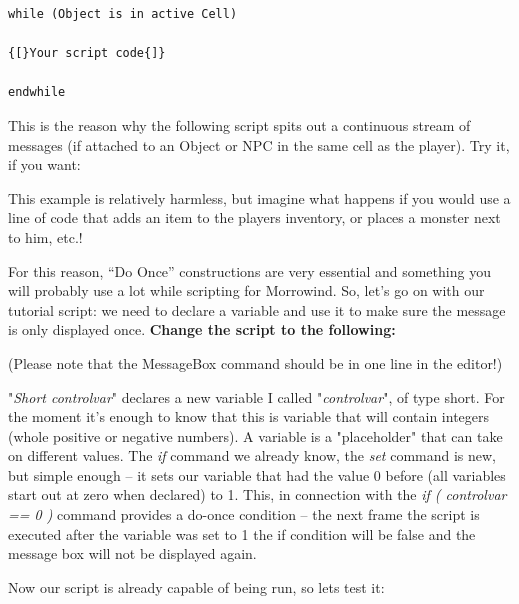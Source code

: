 \begin{lstlisting}
while (Object is in active Cell)

{[}Your script code{]}

endwhile
\end{lstlisting}

This is the reason why the following script spits out a continuous stream of messages (if attached to an Object or NPC in the same cell as the player). Try it, if you want:



This example is relatively harmless, but imagine what happens if you would use a line of code that adds an item to the players inventory, or places a monster next to him, etc.!

For this reason, ``Do Once'' constructions are very essential and something you will probably use a lot while scripting for Morrowind. So, let's go on with our tutorial script: we need to declare a variable and use it to make sure the message is only displayed once. \textbf{Change the script to the following:}



(Please note that the MessageBox command should be in one line in the editor!)

"\emph{Short controlvar}" declares a new variable I called "\emph{controlvar}", of type short. For the moment it's enough to know that this is variable that will contain integers (whole positive or negative numbers). A variable is a "placeholder" that can take on different values. The \emph{if} command we already know, the \emph{set} command is new, but simple enough -- it sets our variable that had the value 0 before (all variables start out at zero when declared) to 1. This, in connection with the \emph{if ( controlvar == 0 )} command provides a do-once condition -- the next frame the script is executed after the variable was set to 1 the if condition will be false and the message box will not be displayed again.

Now our script is already capable of being run, so lets test it:

